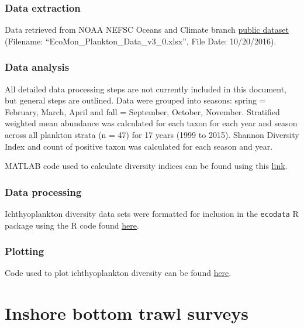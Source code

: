 \documentclass[
]{book}
\begin{document}
\hypertarget{data-extraction-17}{%
\subsection{Data extraction}\label{data-extraction-17}}

Data retrieved from NOAA NEFSC Oceans and Climate branch \href{ftp://ftp.nefsc.noaa.gov/pub/hydro/zooplankton_data/}{public dataset}
(Filename: ``EcoMon\_Plankton\_Data\_v3\_0.xlsx'', File Date: 10/20/2016).

\hypertarget{data-analysis-19}{%
\subsection{Data analysis}\label{data-analysis-19}}

All detailed data processing steps are not currently included in this document, but general steps are outlined. Data were grouped into seasons: spring = February, March, April and fall = September, October, November. Stratified weighted mean abundance was calculated for each taxon for each year and season across all plankton strata (n = 47) for 17 years (1999 to 2015). Shannon Diversity Index and count of positive taxon was calculated for each season and year.

MATLAB code used to calculate diversity indices can be found using this \href{https://github.com/NOAA-EDAB/tech-doc/tree/master/R/stored_scripts/ich_div_analysis}{link}.

\hypertarget{data-processing-14}{%
\subsection{Data processing}\label{data-processing-14}}

Ichthyoplankton diversity data sets were formatted for inclusion in the \texttt{ecodata} R package using the R code found \href{https://github.com/NOAA-EDAB/ecodata/blob/master/data-raw/get_ichthyoplankton.R}{here}.

\hypertarget{plotting-13}{%
\subsection{Plotting}\label{plotting-13}}

Code used to plot ichthyoplankton diversity can be found \href{https://github.com/NOAA-EDAB/tech-doc/tree/master/R/stored_scripts/ich_div_plotting.R}{here}.

\hypertarget{inshoresurvdat}{%
\chapter{Inshore bottom trawl surveys}\label{inshoresurvdat}}
\end{document}
